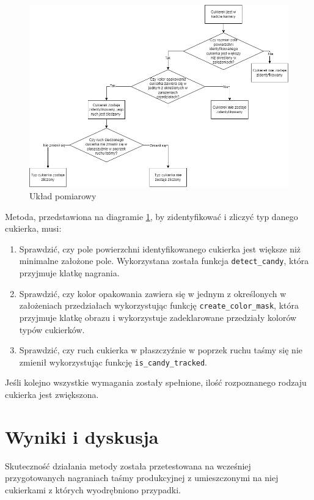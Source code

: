 \documentclass{article}
\begin{document}
\begin{figure}[H]
    \centering
    \includegraphics[width=\linewidth]{Diagram_metody.png}
    \caption{Układ pomiarowy}
    \label{fig:diagramMetody}
\end{figure}

Metoda, przedstawiona na diagramie \ref{fig:diagramMetody}, by zidentyfikować i zliczyć typ danego cukierka, musi:
\begin{enumerate}
    \item Sprawdzić, czy pole powierzchni identyfikowanego cukierka jest większe niż minimalne założone pole. Wykorzystana została funkcja \verb|detect_candy|, która przyjmuje klatkę nagrania.
    \item Sprawdzić, czy kolor opakowania zawiera się w jednym z określonych w założeniach przedziałach wykorzystując funkcję \verb|create_color_mask|, która przyjmuje klatkę obrazu i wykorzystuje zadeklarowane przedziały kolorów typów cukierków.
    \item Sprawdzić, czy ruch cukierka w płaszczyźnie w poprzek ruchu taśmy się nie zmienił wykorzystując funkcję \verb|is_candy_tracked|.
\end{enumerate}
Jeśli kolejno wszystkie wymagania zostały spełnione, ilość rozpoznanego rodzaju cukierka jest zwiększona.

\section{Wyniki i dyskusja}
\label{Wyniki i dyskusja}
Skuteczność działania metody została przetestowana na wcześniej przygotowanych nagraniach taśmy produkcyjnej z umieszczonymi na niej cukierkami z których wyodrębniono przypadki.
\end{document}
